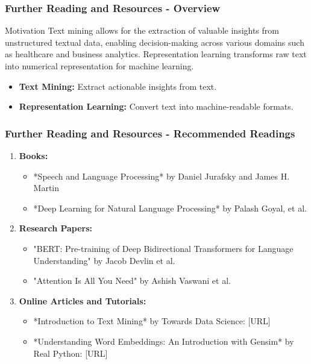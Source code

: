 \documentclass[aspectratio=169]{beamer}
\begin{document}
\begin{frame}[fragile]
    \frametitle{Further Reading and Resources - Overview}
    \begin{block}{Motivation}
        Text mining allows for the extraction of valuable insights from unstructured textual data, enabling decision-making across various domains such as healthcare and business analytics. Representation learning transforms raw text into numerical representation for machine learning.
    \end{block}
    \begin{itemize}
        \item \textbf{Text Mining:} Extract actionable insights from text.
        \item \textbf{Representation Learning:} Convert text into machine-readable formats.
    \end{itemize}
\end{frame}

\begin{frame}[fragile]
    \frametitle{Further Reading and Resources - Recommended Readings}
    \begin{enumerate}
        \item \textbf{Books:}
        \begin{itemize}
            \item *Speech and Language Processing* by Daniel Jurafsky and James H. Martin
            \item *Deep Learning for Natural Language Processing* by Palash Goyal, et al.
        \end{itemize}
        \item \textbf{Research Papers:}
        \begin{itemize}
            \item "BERT: Pre-training of Deep Bidirectional Transformers for Language Understanding" by Jacob Devlin et al.
            \item "Attention Is All You Need" by Ashish Vaswani et al.
        \end{itemize}
        \item \textbf{Online Articles and Tutorials:}
        \begin{itemize}
            \item *Introduction to Text Mining* by Towards Data Science: [URL]
            \item *Understanding Word Embeddings: An Introduction with Gensim* by Real Python: [URL]
        \end{itemize}
    \end{enumerate}
\end{frame}
\end{document}
